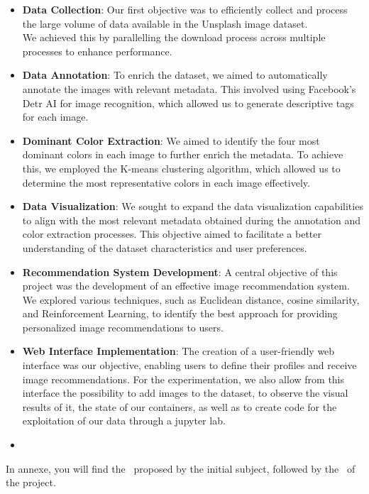 \documentclass{article}
\begin{document}
    \begin{itemize}
        \item \textbf{Data Collection}: Our first objective was to efficiently collect and process the large volume of data available in the Unsplash image dataset.\\We achieved this by parallelling the download process across multiple processes to enhance performance.
        \item \textbf{Data Annotation}: To enrich the dataset, we aimed to automatically annotate the images with relevant metadata. This involved using Facebook's Detr AI for image recognition, which allowed us to generate descriptive tags for each image.
        \item \textbf{Dominant Color Extraction}: We aimed to identify the four most dominant colors in each image to further enrich the metadata. To achieve this, we employed the K-means clustering algorithm, which allowed us to determine the most representative colors in each image effectively.
        \item \textbf{Data Visualization}: We sought to expand the data visualization capabilities to align with the most relevant metadata obtained during the annotation and color extraction processes. This objective aimed to facilitate a better understanding of the dataset characteristics and user preferences.
        \item \textbf{Recommendation System Development}: A central objective of this project was the development of an effective image recommendation system. We explored various techniques, such as Euclidean distance, cosine similarity, and Reinforcement Learning, to identify the best approach for providing personalized image recommendations to users.
        \item \textbf{Web Interface Implementation}: The creation of a user-friendly web interface was our objective, enabling users to define their profiles and receive image recommendations. For the experimentation, we also allow from this interface the possibility to add images to the dataset, to observe the visual results of it, the state of our containers, as well as to create code for the exploitation of our data through a jupyter lab.
    \item \end{itemize}

    In annexe, you will find the~\hyperref[subsec:target_architecture]{} proposed by the initial subject, followed by the~\hyperref[subsec:actual_architecture]{} of the project.
\end{document}
